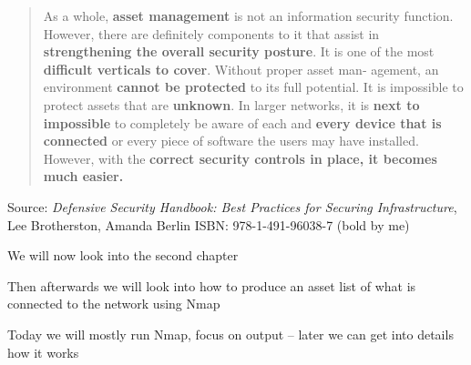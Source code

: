 \documentclass[Screen16to9,17pt]{foils}
\begin{document}


\begin{quote}
As a whole, {\bf asset management} is not an information security function. However,
there are definitely components to it that assist in {\bf strengthening the overall security
posture}. It is one of the most {\bf difficult verticals to cover}. Without proper asset man‐
agement, an environment {\bf cannot be protected} to its full potential. It is impossible to
protect assets that are {\bf unknown}. In larger networks, it is {\bf next to impossible}
to completely be aware of each and {\bf every device that is connected} or every piece of software
the users may have installed. However, with the {\bf correct security controls in place, it
becomes much easier.}
\end{quote}
Source: \emph{Defensive Security Handbook: Best Practices for Securing Infrastructure}, Lee Brotherston, Amanda Berlin ISBN: 978-1-491-96038-7
(bold by me)

\begin{list2}
\item We will now look into the second chapter
\item Then afterwards we will look into how to produce an asset list of what is connected to the network using Nmap
\item Today we will mostly run Nmap, focus on output -- later we can get into details how it works
\end{list2}





\slidenext
\end{document}
